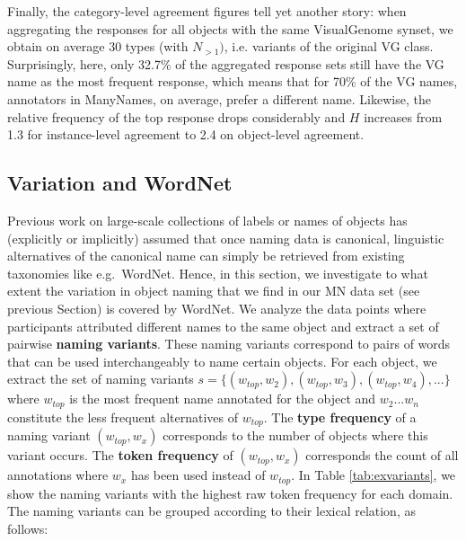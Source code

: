 Finally, the category-level agreement figures tell yet another story: when aggregating the responses for all objects with the same VisualGenome synset, we obtain on average 30 types (with $N_{>1})$, i.e. variants of the original VG class. 
Surprisingly, here, only 32.7\% of the aggregated response sets still have the VG name as the most frequent response, which means that for 70\% of the VG names, annotators in ManyNames, on average, prefer a different name.  
Likewise, the relative frequency of the top response drops considerably and $H$ increases from 1.3 for instance-level agreement to 2.4 on object-level agreement.  
%

\subsection{Variation and WordNet}

Previous work on large-scale collections of labels or names of objects has (explicitly or implicitly) assumed that once naming data is canonical, linguistic alternatives of the canonical name can simply be retrieved from existing taxonomies like e.g.\ WordNet. 
Hence, in this section, we investigate to what extent the variation in object naming that we find in our MN data set (see previous Section) is covered by WordNet.
We analyze the data points where participants attributed different names to the same object and extract a set of  pairwise \textbf{naming variants}. These naming variants correspond to pairs of words that can be used interchangeably to name certain objects.
For each object, we extract the set of naming variants $s = \{ (w_{top},w_2), (w_{top},w_3), (w_{top},w_4),... \}$  where $w_{top}$ is the most frequent name annotated for the object and $w_2 ... w_n$ constitute the less frequent alternatives of $w_{top}$.  The  \textbf{type frequency} of a naming variant $(w_{top},w_x)$ corresponds to the number of objects where this variant occurs. The \textbf{token frequency} of $(w_{top},w_x)$ corresponds the count of all annotations where $w_x$ has been used instead of $w_{top}$.
In Table \ref{tab:exvariants}, we show the naming variants with the highest raw token frequency for each domain. 
The naming variants can be grouped according to their lexical relation, as follows:

